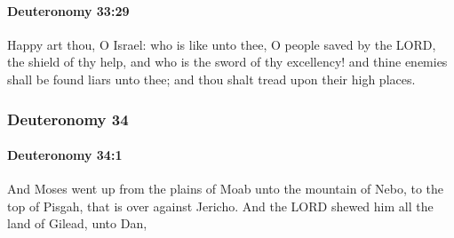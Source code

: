 		\paragraph{Deuteronomy 33:29} %
			\label{DEUTERONOMY-33-29}

			Happy art thou, O Israel: who is like unto thee, O people saved by the LORD, the shield of thy help, and who is the sword of thy excellency! and thine enemies shall be found liars unto thee; and thou shalt tread upon their high places.

	\subsubsection{Deuteronomy 34} %
		\label{DEUTERONOMY-34}

		\paragraph{Deuteronomy 34:1} %
			\label{DEUTERONOMY-34-1}

			And Moses went up from the plains of Moab unto the mountain of Nebo, to the top of Pisgah, that is over against Jericho. And the LORD shewed him all the land of Gilead, unto Dan,

